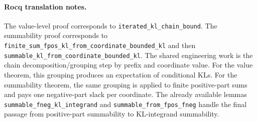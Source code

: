 \paragraph{Rocq translation notes.}
The value-level proof corresponds to \texttt{iterated\_kl\_chain\_bound}.  The
summability proof corresponds to
\texttt{finite\_sum\_fpos\_kl\_from\_coordinate\_bounded\_kl} and then
\texttt{summable\_kl\_from\_coordinate\_bounded\_kl}.  The shared engineering
work is the chain decomposition/grouping step by prefix and coordinate value.
For the value theorem, this grouping produces an expectation of conditional
KLs.  For the summability theorem, the same grouping is applied to finite
positive-part sums and pays one negative-part slack per coordinate.  The
already available lemmas \texttt{summable\_fneg\_kl\_integrand} and
\texttt{summable\_from\_fpos\_fneg} handle the final passage from positive-part
summability to KL-integrand summability.
